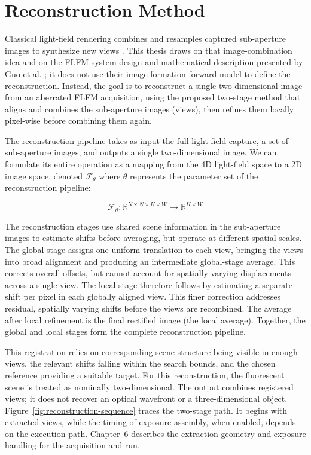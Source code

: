 \chapter{Reconstruction Method}

\begingroup
\raggedbottom

Classical light-field rendering combines and resamples captured sub-aperture images to synthesize new views \cite{levoyHanrahanLightFieldRendering2023}. This thesis draws on that image-combination idea and on the FLFM system design and mathematical description presented by Guo et al. \cite{guo2019fourierLightField}; it does not use their image-formation forward model to define the reconstruction. Instead, the goal is to reconstruct a single two-dimensional image from an aberrated FLFM acquisition, using the proposed two-stage method that aligns and combines the sub-aperture images (views), then refines them locally pixel-wise before combining them again.

The reconstruction pipeline takes as input the full light-field capture, a set of sub-aperture images, and outputs a single two-dimensional image. We can formulate its entire operation as a mapping from the 4D light-field space to a 2D image space, denoted $\mathcal{F}_{\theta}$ where $\theta$ represents the parameter set of the reconstruction pipeline:

\begin{equation}
    \mathcal{F}_{\theta}: \mathbb{R} ^{N \times N \times H \times W } \rightarrow \mathbb{R} ^{H \times W}
\end{equation}

The reconstruction stages use shared scene information in the sub-aperture images to estimate shifts before averaging, but operate at different spatial scales. The global stage assigns one uniform translation to each view, bringing the views into broad alignment and producing an intermediate global-stage average. This corrects overall offsets, but cannot account for spatially varying displacements across a single view. The local stage therefore follows by estimating a separate shift per pixel in each globally aligned view. This finer correction addresses residual, spatially varying shifts before the views are recombined. The average after local refinement is the final rectified image (the local average). Together, the global and local stages form the complete reconstruction pipeline.

This registration relies on corresponding scene structure being visible in enough views, the relevant shifts falling within the search bounds, and the chosen reference providing a suitable target. For this reconstruction, the fluorescent scene is treated as nominally two-dimensional. The output combines registered views; it does not recover an optical wavefront or a three-dimensional object. Figure~\ref{fig:reconstruction-sequence} traces the two-stage path. It begins with extracted views, while the timing of exposure assembly, when enabled, depends on the execution path. Chapter~6 describes the extraction geometry and exposure handling for the acquisition and run.

